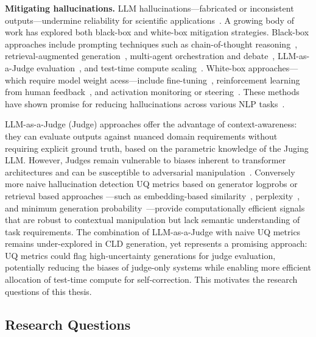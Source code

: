 \medskip
\noindent
\textbf{Mitigating hallucinations.} LLM hallucinations---fabricated or inconsistent outputs---undermine reliability for scientific applications~\citep{zhao2023explainability, varshney2023stitch}. A growing body of work has explored both black-box and white-box mitigation strategies. Black-box approaches include prompting techniques such as chain-of-thought reasoning~\citep{wei2022chain, brown2020language}, retrieval-augmented generation~\citep{lewis2020retrieval, zhang2024causal}, multi-agent orchestration and debate~\citep{shinn2024reflexion, lu2024ai}, LLM-as-a-Judge evaluation~\citep{zheng2024judging}, and test-time compute scaling~\citep{openai2024reasoning, shinn2024reflexion, guo2025deepseek}. White-box approaches---which require model weight acess---include fine-tuning~\citep{hu2021lora}, reinforcement learning from human feedback~\citep{ouyang2022rlhf}, and activation monitoring or steering~\citep{wang2024adaptive}. These methods have shown promise for reducing hallucinations across various NLP tasks~\citep{tonmoy2024comprehensive}.

LLM-as-a-Judge (Judge) approaches offer the advantage of context-awareness: they can evaluate outputs against nuanced domain requirements without requiring explicit ground truth, based on the parametric knowledge of the Juging LLM. However, Judges remain vulnerable to biases inherent to transformer architectures and can be susceptible to adversarial manipulation~\citep{li2024llms, shi2024optimization}. Conversely more naive hallucination detection UQ metrics based on generator logprobs or retrieval based approaches ---such as embedding-based similarity~\citep{lewis2020retrieval, zhang2024causal}, perplexity~\citep{valentin2024cost, tonmoy2024comprehensive}, and minimum generation probability~\citep{varshney2023stitch}---provide computationally efficient signals that are robust to contextual manipulation but lack semantic understanding of task requirements. The combination of LLM-as-a-Judge with naive UQ metrics remains under-explored in CLD generation, yet represents a promising approach: UQ metrics could flag high-uncertainty generations for judge evaluation, potentially reducing the biases of judge-only systems while enabling more efficient allocation of test-time compute for self-correction.
This motivates the research questions of this thesis.

\subsection*{Research Questions}

